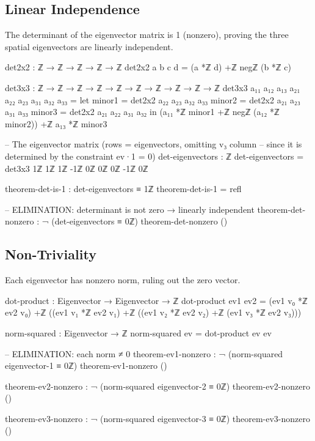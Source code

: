 \documentclass[11pt,a4paper]{article}
\begin{document}
\subsection{Linear Independence}

The determinant of the eigenvector matrix is 1 (nonzero), proving
the three spatial eigenvectors are linearly independent.

\begin{code}
det2x2 : ℤ → ℤ → ℤ → ℤ → ℤ
det2x2 a b c d = (a *ℤ d) +ℤ negℤ (b *ℤ c)

det3x3 : ℤ → ℤ → ℤ → ℤ → ℤ → ℤ → ℤ → ℤ → ℤ → ℤ
det3x3 a₁₁ a₁₂ a₁₃ a₂₁ a₂₂ a₂₃ a₃₁ a₃₂ a₃₃ =
  let minor1 = det2x2 a₂₂ a₂₃ a₃₂ a₃₃
      minor2 = det2x2 a₂₁ a₂₃ a₃₁ a₃₃
      minor3 = det2x2 a₂₁ a₂₂ a₃₁ a₃₂
  in (a₁₁ *ℤ minor1 +ℤ negℤ (a₁₂ *ℤ minor2)) +ℤ a₁₃ *ℤ minor3

-- The eigenvector matrix (rows = eigenvectors, omitting v₃ column
-- since it is determined by the constraint ev·1 = 0)
det-eigenvectors : ℤ
det-eigenvectors = det3x3
  1ℤ   1ℤ   1ℤ
  -1ℤ  0ℤ   0ℤ
  0ℤ   -1ℤ  0ℤ

theorem-det-is-1 : det-eigenvectors ≡ 1ℤ
theorem-det-is-1 = refl

-- ELIMINATION: determinant is not zero → linearly independent
theorem-det-nonzero : ¬ (det-eigenvectors ≡ 0ℤ)
theorem-det-nonzero ()
\end{code}

\subsection{Non-Triviality}

Each eigenvector has nonzero norm, ruling out the zero vector.

\begin{code}
dot-product : Eigenvector → Eigenvector → ℤ
dot-product ev1 ev2 =
  (ev1 v₀ *ℤ ev2 v₀) +ℤ
  ((ev1 v₁ *ℤ ev2 v₁) +ℤ
  ((ev1 v₂ *ℤ ev2 v₂) +ℤ
  (ev1 v₃ *ℤ ev2 v₃)))

norm-squared : Eigenvector → ℤ
norm-squared ev = dot-product ev ev

-- ELIMINATION: each norm ≠ 0
theorem-ev1-nonzero : ¬ (norm-squared eigenvector-1 ≡ 0ℤ)
theorem-ev1-nonzero ()

theorem-ev2-nonzero : ¬ (norm-squared eigenvector-2 ≡ 0ℤ)
theorem-ev2-nonzero ()

theorem-ev3-nonzero : ¬ (norm-squared eigenvector-3 ≡ 0ℤ)
theorem-ev3-nonzero ()
\end{code}
\end{document}
